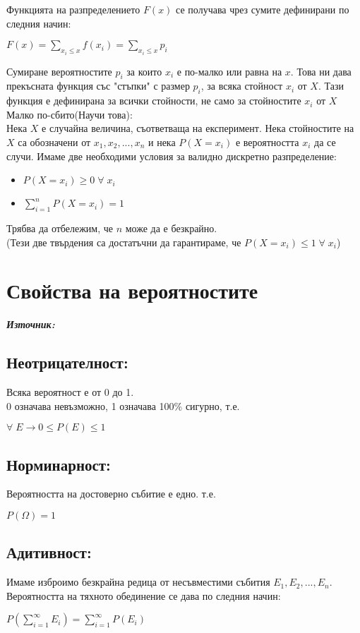 \documentclass[11pt]{article} %
\newcommand{\italicBold}[1]{\textbf{\emph{#1}}}
\newcommand{\source}{\italicBold{Източник: }}
\begin{document}
Функцията на разпределението $F(x)$ се получава чрез сумите дефинирани по следния начин:\\
\centerline{$F(x)=\displaystyle \sum_{x_{i} \leq x}f(x_{i})=\sum_{x_{i}\leq x}p_{i}$}
Сумиране вероятностите $p_{i}$ за които $x_{i}$ е по-малко или равна на $x$. Това ни дава прекъсната функция със "стъпки" с размер $p_{i}$, за всяка стойност $x_{i}$ от $X$. Тази функция е дефинирана за всички стойности, не само за стойностите $x_{i}$ от $X$\\

Малко по-сбито(Научи това):\\
Нека $X$ е случайна величина, съответваща на експеримент. Нека стойностите на $X$ са обозначени от $x_{1}, x_{2},...,x_{n}$ и нека $P(X=x_{i})$ е вероятността $x_{i}$ да се случи. Имаме две необходими условия за валидно дискретно разпределение:\\
\begin{itemize}
	\item $P(X = x_{i}) \geq 0 \; \forall \; x_{i}$\\
	\item $\displaystyle \sum_{i=1}^{n}P(X=x_{i})=1$\\
\end{itemize}
Трябва да отбележим, че $n$ може да е безкрайно.\\
(Тези две твърдения са достатъчни да гарантираме, че $P(X=x_{i})\leq 1 \; \forall \; x_{i}$)

\section{Свойства на вероятностите}
\source {}

\subsection{Неотрицателност:} 
Всяка вероятност е от 0 до 1.\\
0 означава невъзможно, 1 означава 100\% сигурно, т.е.\\
\centerline{$\forall \; E \to 0 \leq P(E) \leq 1$}

\subsection{Норминарност:}
Вероятността на достоверно събитие е едно. т.е.\\
\centerline{$P(\Omega) = 1$}

\subsection{Адитивност:}
Имаме изброимо безкрайна редица от несъвместими събития $E_{1}, E_{2},...,E_{n}$. Вероятността на тяхното обединение се дава по следния начин:\\
\centerline{$P\displaystyle(\sum_{i=1}^{\infty}E_{i})=\sum_{i=1}^{\infty}P(E_{i})$}
\end{document}
